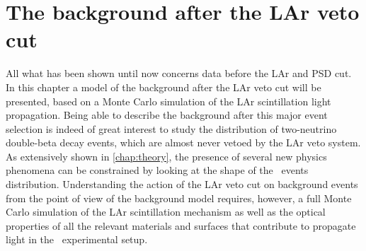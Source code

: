 
\chapter{The background after the LAr veto cut}

All what has been shown until now concerns data before the LAr and PSD cut. In this
chapter a model of the background after the LAr veto cut will be presented, based on a
Monte Carlo simulation of the LAr scintillation light propagation. Being able to describe
the background after this major event selection is indeed of great interest to study the
distribution of two-neutrino double-beta decay events, which are almost never vetoed by
the LAr veto system. As extensively shown in \cref{chap:theory}, the presence of several
new physics phenomena can be constrained by looking at the shape of the \nnbb\ events
distribution. Understanding the action of the LAr veto cut on background events from the
point of view of the background model requires, however, a full Monte Carlo simulation of
the LAr scintillation mechanism as well as the optical properties of all the relevant
materials and surfaces that contribute to propagate light in the \gerda\ experimental
setup.


